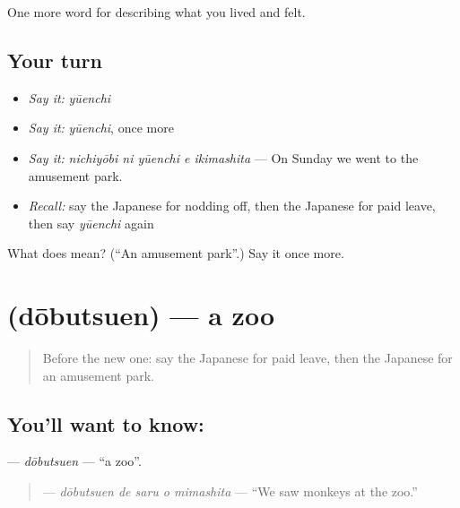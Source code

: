 \begin{grammarlens}[title={What you've built}]
One more word for describing what you lived and felt.
\end{grammarlens}

\subsection*{Your turn}
\begin{itemize}
\raggedright
  \item \emph{Say it:} \emph{yūenchi}
  \item \emph{Say it:} \emph{yūenchi}, once more
  \item \emph{Say it:} \emph{nichiyōbi ni yūenchi e ikimashita} — On Sunday we went to the amusement park.
  \item \emph{Recall:} say the Japanese for nodding off, then the Japanese for paid leave, then say \emph{yūenchi} again
\end{itemize}

\begin{tcolorbox}[breakable,colback=teal!4,colframe=teal!35!black,title={Before you move on}]
What does  mean? (\textquotedblleft{}An amusement park\textquotedblright{}.) Say it once more.
\end{tcolorbox}
\section[\texorpdfstring{\ja{どうぶつえん} (dōbutsuen)}{どうぶつえん (dōbutsuen)}]{ (dōbutsuen) — a zoo}

\label{lesson:JA-C499-doubutsuen}



\begin{quote}
Before the new one: say the Japanese for paid leave, then the Japanese for an amusement park.
\end{quote}

\subsection*{You'll want to know: }
\textbf{} — \emph{dōbutsuen} — \textquotedblleft{}a zoo\textquotedblright{}.

\begin{quote}
\textbf{  } — \emph{dōbutsuen de saru o mimashita} — \textquotedblleft{}We saw monkeys at the zoo.\textquotedblright{}
\end{quote}

